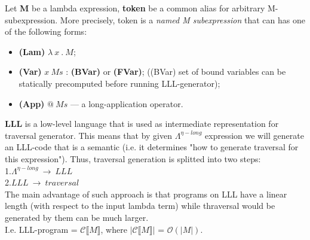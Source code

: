 \documentclass[a4paper, 10pt]{article}
\newcommand\abs[1]{\left|#1\right|}
\begin{document}
Let \textbf{M} be a lambda expression, \textbf{token} be a common alias for arbitrary M-subexpression. More precisely, token is a \textit{named M subexpression} that can has one of the following forms:
\begin{itemize}
\item \textbf{(Lam)} $\lambda\ x\ .\ M$;
\item \textbf{(Var)} $x\ Ms$ : \textbf{(BVar)} or \textbf{(FVar)}; ((BVar) set of bound variables can be statically precomputed before running LLL-generator);
\item \textbf{(App)} $@\ Ms$ --- a long-application operator.
\end{itemize}

\textbf{LLL} is a low-level language that is used as intermediate representation for traversal generator. This means that by given $\Lambda^{\eta-long}$ expression we will generate an LLL-code that is a semantic (i.e. it determines "how to generate traversal for this expression"). Thus, traversal generation is splitted into two steps:\\
1.$\Lambda^{\eta-long}\ \rightarrow \ LLL$\\
2.$LLL\ \rightarrow \ traversal$\\
The main advantage of such approach is that
programs on LLL have a linear length (with respect to the input lambda term) while thraversal would be generated by them can be much larger.\\
I.e. LLL-program = $\mathcal{C}\llbracket M \rrbracket$, where $\abs{\mathcal{C}\llbracket M \rrbracket}$ = $\mathcal{O}(\abs{M})$.
\end{document}
